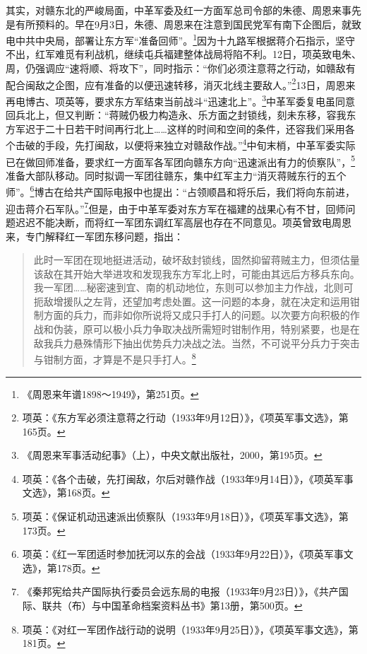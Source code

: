 其实，对赣东北的严峻局面，中革军委及红一方面军总司令部的朱德、周恩来事先是有所预料的。早在9月3日，朱德、周恩来在注意到国民党军有南下企图后，就致电中共中央局，部署让东方军“准备回师”。\footnote{《周恩来年谱1898～1949》，第251页。}因为十九路军根据蒋介石指示，坚守不出，红军难觅有利战机，继续屯兵福建整体战局将陷不利。12日，项英致电朱、周，仍强调应“速将顺、将攻下”，同时指示：“你们必须注意蒋之行动，如赣敌有配合闽敌之企图，应有准备的以便迅速转移，消灭北线主要敌人。”\footnote{项英：《东方军必须注意蒋之行动（1933年9月12日）》，《项英军事文选》，第165页。}13日，周恩来再电博古、项英等，要求东方军结束当前战斗“迅速北上”。\footnote{《周恩来军事活动纪事》（上），中央文献出版社，2000，第195页。}中革军委复电虽同意回兵北上，但又判断：“蒋贼仍极力构造永、乐方面之封锁线，刻未东移，容我东方军迟于二十日若干时间再行北上……这样的时间和空间的条件，还容我们采用各个击破的手段，先打闽敌，以便将来独立对赣敌作战。”\footnote{项英：《各个击破，先打闽敌，尔后对赣作战（1933年9月14日）》，《项英军事文选》，第168页。}中旬末梢，中革军委实际已在做回师准备，要求红一方面军各军团向赣东方向“迅速派出有力的侦察队”，\footnote{项英：《保证机动迅速派出侦察队（1933年9月18日）》，《项英军事文选》，第173页。}准备大部队移动。同时拟调一军团往赣东，集中红军主力“消灭蒋贼东行的五个师”。\footnote{项英：《红一军团适时参加抚河以东的会战（1933年9月22日）》，《项英军事文选》，第178页。}博古在给共产国际电报中也提出：“占领顺昌和将乐后，我们将向东前进，迎击蒋介石军队。”\footnote{《秦邦宪给共产国际执行委员会远东局的电报（1933年9月23日）》，《共产国际、联共（布）与中国革命档案资料丛书》第13册，第500页。}但是，由于中革军委对东方军在福建的战果心有不甘，回师问题迟迟不能决断，而将红一军团东调红军高层也存在不同意见。项英曾致电周恩来，专门解释红一军团东移问题，指出：

\begin{quote}

此时一军团在现地挺进活动，破坏敌封锁线，固然抑留蒋贼主力，但须估量该敌在其开始大举进攻和发现我东方军北上时，可能由其远后方移兵东向。我一军团……秘密速到宜、南的机动地位，东则可以参加主力作战，北则可扼敌增援队之左背，还望加考虑处置。这一问题的本身，就在决定和运用钳制方面的兵力，而非如你所说将又成只手打人的问题。以次要方向积极的作战和伪装，原可以极小兵力争取决战所需短时钳制作用，特别紧要，也是在敌我兵力悬殊情形下抽出优势兵力决战之法。当然，不可说平分兵力于突击与钳制方面，才算是不是只手打人。\footnote{项英：《对红一军团作战行动的说明（1933年9月25日）》，《项英军事文选》，第181页。}
\end{quote}


